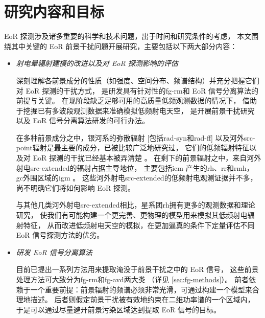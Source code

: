 \section{研究内容和目标}

EoR 探测涉及诸多重要的科学和技术问题，出于时间和研究条件的考虑，
本文围绕其中关键的 EoR 前景干扰问题开展研究，主要包括以下两大部分内容：

\begin{itemize}
\item \emph{射电晕辐射建模的改进以及对 EoR 探测影响的评估}

\hspace{2\ccwd}%
深刻理解各前景成分的性质（如强度、空间分布、频谱结构）并充分把握它们对 EoR 探测的干扰方式，
是研发具有针对性的\ac{fg-rm}和 EoR 信号分离算法的前提与关键。
在现阶段缺乏足够可用的高质量低频观测数据的情况下，
借助于挖掘已有多波段观测数据来准确模拟低频射电天空，
是开展前景干扰研究以及 EoR 信号分离算法研发的可行办法。

\hspace{2\ccwd}%
在多种前景成分之中，银河系的弥散辐射 [包括\ac{rad-syn}和\ac{rad-ff}]
以及河外\ac{src-point}辐射是最主要的成分，已被比较广泛地研究过，
它们的低频辐射特征以及对 EoR 探测的干扰已经基本被弄清楚
\cite{shaver1999,diMatteo2004,gleser2008,liu2012,murray2017,spinelli2018}。
在剩下的前景辐射之中，来自河外射电\ac{src-extended}的辐射占据主导地位，
主要包括\ac{icm} \cite{feretti2012} 产生的\ac{rh}、\ac{rr}和\ac{rmh}，
\ac{gc}外围区域的\ac{igm} \cite{keshet2004}。
这些河外射电\ac{src-extended}的低频射电观测证据并不多，
尚不明确它们将如何影响 EoR 探测。

\hspace{2\ccwd}%
与其他几类河外射电\ac{src-extended}相比，星系团\ac{rh}拥有更多的观测数据和理论研究，
使我们有可能构建一个更完善、更物理的模型用来模拟其低频射电辐射特征，
从而改进低频射电天空的模拟，在更加逼真的条件下定量评估不同 EoR 信号探测方法的优劣。

\item \emph{研发 EoR 信号分离算法}

\hspace{2\ccwd}%
目前已提出一系列方法用来提取淹没于前景干扰之中的 EoR 信号，
这些前景处理方法可大致分为\ac{fg-rm}和\ac{fg-avd}两大类 \cite{chapman2016}
（详见 \autoref{sec:fg-methods}）。
前者依赖于一个重要前提：前景辐射的频谱必须非常光滑，可通过构建一个模型来合理地描述。
后者则假定前景干扰被有效地约束在二维功率谱的一个区域内，
于是可以通过尽量避开前景污染区域达到提取 EoR 信号的目标。


\end{itemize}

